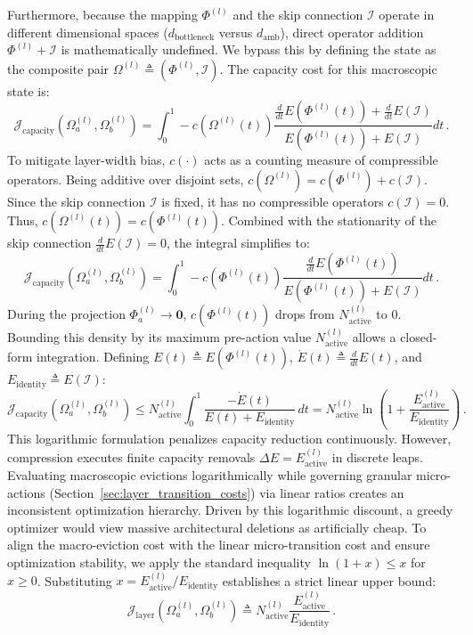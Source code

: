 \documentclass[11pt, a4paper, copyright, gdm]{google}
\newcommand{\zeroVect}{\boldsymbol{0}}
\newcommand{\calI}{\mathcal{I}}
\newcommand{\calJ}{\mathcal{J}}
\theoremstyle{definition}
\begin{document}
Furthermore, because the mapping $\Phi^{(l)}$ and the skip connection $\calI$ operate in different dimensional spaces ($d_{\text{bottleneck}}$ versus $d_{\text{amb}}$), direct operator addition $\Phi^{(l)} + \calI$ is mathematically undefined. We bypass this by defining the state as the composite pair $\Omega^{(l)} \triangleq (\Phi^{(l)}, \calI)$. The capacity cost for this macroscopic state is:  
\begin{equation}
    \label{eq:app_fundamental_ode_macro}
    \calJ_{\text{capacity}}(\Omega_a^{(l)}, \Omega_b^{(l)}) = \int_{0}^{1} -c(\Omega^{(l)}(t)) \frac{\frac{d}{dt} E(\Phi^{(l)}(t)) + \frac{d}{dt} E(\calI)}{E(\Phi^{(l)}(t)) + E(\calI)} dt \,.
\end{equation}
To mitigate layer-width bias, $c(\cdot)$ acts as a counting measure of compressible operators. Being additive over disjoint sets, $c(\Omega^{(l)}) = c(\Phi^{(l)}) + c(\calI)$. Since the skip connection $\calI$ is fixed, it has no compressible operators $c(\calI) = 0$. Thus, $c(\Omega^{(l)}(t)) = c(\Phi^{(l)}(t))$. Combined with the stationarity of the skip connection $\frac{d}{dt} E(\calI) = 0$, the integral simplifies to:
\begin{equation}
    \calJ_{\text{capacity}}(\Omega_a^{(l)}, \Omega_b^{(l)}) = \int_{0}^{1} -c(\Phi^{(l)}(t)) \frac{\frac{d}{dt} E(\Phi^{(l)}(t))}{E(\Phi^{(l)}(t)) + E(\calI)} dt \,.
\end{equation}
During the projection $\Phi_a^{(l)} \to \zeroVect$, $c(\Phi^{(l)}(t))$ drops from $N_{\text{active}}^{(l)}$ to $0$. Bounding this density by its maximum pre-action value $N_{\text{active}}^{(l)}$ allows a closed-form integration. Defining $E(t) \triangleq E(\Phi^{(l)}(t))$, $\dot{E}(t) \triangleq \frac{d}{dt}E(t)$, and $E_{\text{identity}} \triangleq E(\calI)$:
\begin{equation}
    \calJ_{\text{capacity}}(\Omega_a^{(l)}, \Omega_b^{(l)}) \leq N_{\text{active}}^{(l)} \int_{0}^{1} \frac{-\dot{E}(t)}{E(t) + E_{\text{identity}}} \, dt = N_{\text{active}}^{(l)} \ln\left( 1 + \frac{E_{\text{active}}^{(l)}}{E_{\text{identity}}} \right) \,.
\end{equation}
This logarithmic formulation penalizes capacity reduction continuously. However, compression executes finite capacity removals $\Delta E = E_{\text{active}}^{(l)}$ in discrete leaps. Evaluating macroscopic evictions logarithmically while governing granular micro-actions (Section~\ref{sec:layer_transition_costs}) via linear ratios creates an inconsistent optimization hierarchy. Driven by this logarithmic discount, a greedy optimizer would view massive architectural deletions as artificially cheap. To align the macro-eviction cost with the linear micro-transition cost and ensure optimization stability, we apply the standard inequality $\ln(1+x) \le x$ for $x \ge 0$. Substituting $x = E_{\text{active}}^{(l)} / E_{\text{identity}}$ establishes a strict linear upper bound:
\begin{equation}
    \calJ_{\text{layer}}(\Omega_a^{(l)}, \Omega_b^{(l)}) \triangleq N_{\text{active}}^{(l)} \frac{E_{\text{active}}^{(l)}}{E_{\text{identity}}} \,.
\end{equation}
\end{document}
